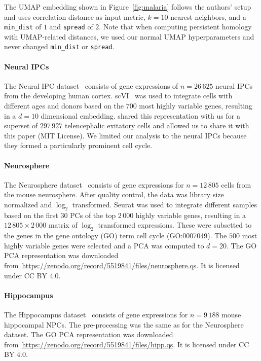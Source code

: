 \documentclass{article}
\theoremstyle{plain}
\theoremstyle{definition}
\theoremstyle{remark}
\begin{document}
The UMAP embedding shown in Figure~\ref{fig:malaria} follows the authors' setup and uses correlation distance as input metric, $k=10$ nearest neighbors, and a \texttt{min\_dist} of $1$ and \texttt{spread} of $2$. Note that when computing persistent homology with UMAP-related distances, we used our normal UMAP hyperparameters and never changed \texttt{min\_dist} or \texttt{spread}.

\paragraph{Neural IPCs}
The Neural IPC dataset~\citep{braun2023comprehensive} consists of gene expressions of \mbox{$n=26\,625$} neural IPCs from the developing human cortex. scVI~\citep{lopez2018deep} was used to integrate cells with different ages and donors based on the $700$ most highly variable genes, resulting in a $d=10$ dimensional embedding. \citet{braun2023comprehensive} shared this representation with us for a superset of $297\,927$ telencephalic exitatory cells and allowed us to share it with this paper (MIT License). We limited our analysis to the neural IPCs because they formed a particularly prominent cell cycle.


\paragraph{Neurosphere}
The Neurosphere dataset~\citep{zheng2022universal} consists of gene expressions for $n=12\,805$ cells from the mouse neurosphere. After quality control, the data was library size normalized and $\log_2$ transformed. Seurat was used to integrate different samples based on the first $30$ PCs of the top $2\,000$ highly variable genes, resulting in a $12\,805 \times 2\,000$ matrix of $\log_2$ transformed expressions. These were subsetted to the genes in the gene ontology (GO) term cell cycle (GO:0007049). The $500$ most highly variable genes were selected and a PCA was computed to $d=20$. The GO PCA representation was downloaded from~\url{https://zenodo.org/record/5519841/files/neurosphere.qs}. It is licensed under CC BY 4.0.

\paragraph{Hippocampus}
The Hippocampus dataset~\citep{zheng2022universal} consists of gene expressions for $n=9\,188$ mouse hippocampal NPCs. The pre-processing was the same as for the Neurosphere dataset. The GO PCA representation was downloaded from~\url{https://zenodo.org/record/5519841/files/hipp.qs}. It is licensed under CC BY 4.0.
\end{document}
